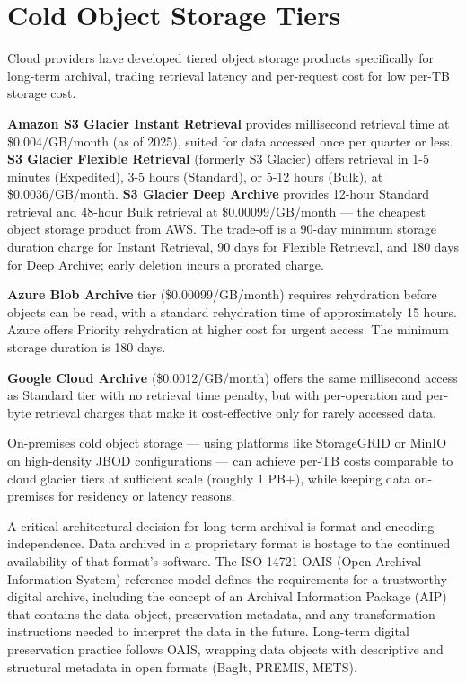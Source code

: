 \section{Cold Object Storage Tiers}
Cloud providers have developed tiered object storage products specifically for long-term archival, trading retrieval latency and per-request cost for low per-TB storage cost.

\textbf{Amazon S3 Glacier Instant Retrieval} provides millisecond retrieval time at \$0.004/GB/month (as of 2025), suited for data accessed once per quarter or less. \textbf{S3 Glacier Flexible Retrieval} (formerly S3 Glacier) offers retrieval in 1-5 minutes (Expedited), 3-5 hours (Standard), or 5-12 hours (Bulk), at \$0.0036/GB/month. \textbf{S3 Glacier Deep Archive} provides 12-hour Standard retrieval and 48-hour Bulk retrieval at \$0.00099/GB/month --- the cheapest object storage product from AWS. The trade-off is a 90-day minimum storage duration charge for Instant Retrieval, 90 days for Flexible Retrieval, and 180 days for Deep Archive; early deletion incurs a prorated charge.

\textbf{Azure Blob Archive} tier (\$0.00099/GB/month) requires rehydration before objects can be read, with a standard rehydration time of approximately 15 hours. Azure offers Priority rehydration at higher cost for urgent access. The minimum storage duration is 180 days.

\textbf{Google Cloud Archive} (\$0.0012/GB/month) offers the same millisecond access as Standard tier with no retrieval time penalty, but with per-operation and per-byte retrieval charges that make it cost-effective only for rarely accessed data.

On-premises cold object storage --- using platforms like StorageGRID or MinIO on high-density JBOD configurations --- can achieve per-TB costs comparable to cloud glacier tiers at sufficient scale (roughly 1 PB+), while keeping data on-premises for residency or latency reasons.

A critical architectural decision for long-term archival is format and encoding independence. Data archived in a proprietary format is hostage to the continued availability of that format's software. The ISO 14721 OAIS (Open Archival Information System) reference model defines the requirements for a trustworthy digital archive, including the concept of an Archival Information Package (AIP) that contains the data object, preservation metadata, and any transformation instructions needed to interpret the data in the future. Long-term digital preservation practice follows OAIS, wrapping data objects with descriptive and structural metadata in open formats (BagIt, PREMIS, METS).

